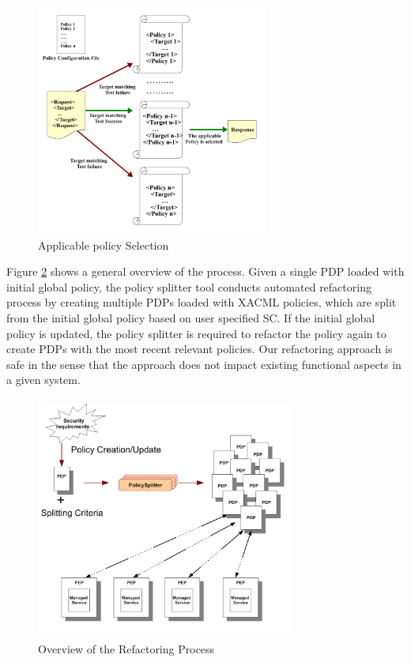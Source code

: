 \begin{figure}[!h]
\begin{center}
\includegraphics[width=3in, height=3in]{requestevaluation}
\caption{Applicable policy Selection}
\label{requestevaluation}
\end{center}
\end{figure}


Figure \ref{overallprocess} shows a general overview of the process. Given a single PDP loaded with initial global policy, the policy splitter 
tool conducts automated refactoring process by creating multiple PDPs loaded with XACML 
policies, which are split from the initial global policy based on user specified SC.
If the initial global policy is updated, the policy splitter is required to refactor the policy again to create PDPs with the most recent relevant 
policies. Our refactoring approach is safe in the sense that the approach does not impact existing functional aspects in a given
system.
\begin{figure}[!h]
\begin{center}
\includegraphics[width=8.5cm, height=8cm]{Overall-process}
\caption{Overview of the Refactoring Process}
\label{overallprocess}
\end{center}
\end{figure}



